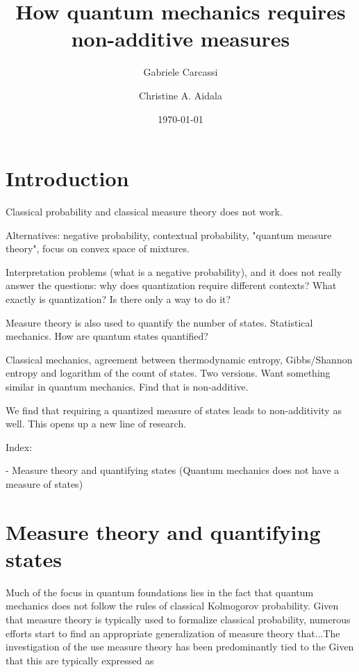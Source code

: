 \documentclass[10pt,twocolumn, nofootinbib]{revtex4-2}
\begin{document}
\title{How quantum mechanics requires non-additive measures}
\author{Gabriele Carcassi}
\author{Christine A. Aidala}

\date{\today}


\begin{abstract}
\end{abstract}

\maketitle

\section{Introduction}

Classical probability and classical measure theory does not work.

Alternatives: negative probability, contextual probability, "quantum measure theory", focus on convex space of mixtures.

Interpretation problems (what is a negative probability), and it does not really answer the questions: why does quantization require different contexts? What exactly is quantization? Is there only a way to do it?

Measure theory is also used to quantify the number of states. Statistical mechanics. How are quantum states quantified?

Classical mechanics, agreement between thermodynamic entropy, Gibbs/Shannon entropy and logarithm of the count of states. Two versions. Want something similar in quantum mechanics. Find that is non-additive.

We find that requiring a quantized measure of states leads to non-additivity as well. This opens up a new line of research.

Index:

- Measure theory and quantifying states
(Quantum mechanics does not have a measure of states)

\section{Measure theory and quantifying states}

Much of the focus in quantum foundations lies in the fact that quantum mechanics does not follow the rules of classical Kolmogorov probability. Given that measure theory is typically used to formalize classical probability, numerous efforts start to find an appropriate generalization of measure theory that...The investigation of the use measure theory has been predominantly tied to the Given that this are typically expressed as 
\end{document}

